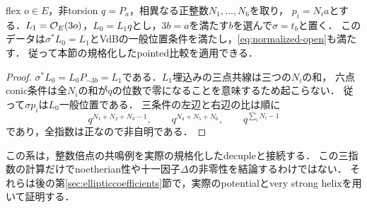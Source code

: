 \begin{corollary}[整数倍点の明示的な共通領域]\label{cor:normalized-cyclic-family}
flex $o\in E$，非torsion $q=P_a$，相異なる正整数$N_1,\ldots,N_6$を取り，
$p_i=N_i a$とする．$L_1=\mathcal O_E(3o)$，$L_0=L_1q$とし，$3b=a$を満たす$b$を選んで$\sigma=t_b$と置く．
このデータは$\sigma^*L_0=L_1$とVdBの一般位置条件を満たし，\eqref{eq:normalized-open}も満たす．
従って本節の規格化したpointed比較を適用できる．
\end{corollary}
\begin{proof}
$\sigma^*L_0=L_0P_{-3b}=L_1$である．$L_1$埋込みの三点共線は三つの$N_i$の和，
六点conic条件は全$N_i$の和が$q$の位数で零になることを意味するため起こらない．
従って$\sigma p_i$は$L_0$一般位置である．
三条件の左辺と右辺の比は順に
\[
 q^{N_1+N_2+N_3-1},\qquad
 q^{N_4+N_5+N_6},\qquad
 q^{\sum_iN_i-1}
\]
であり，全指数は正なので非自明である．
\end{proof}
\begin{remark}
この系は，整数倍点の共鳴例を実際の規格化したdecupleと接続する．
この三指数の計算だけでnoetherian性や十一因子$\Delta$の非零性を結論するわけではない．
それらは後の第\ref{sec:ellipticcoefficients}節で，実際のpotentialとvery strong helixを用いて証明する．
\end{remark}
